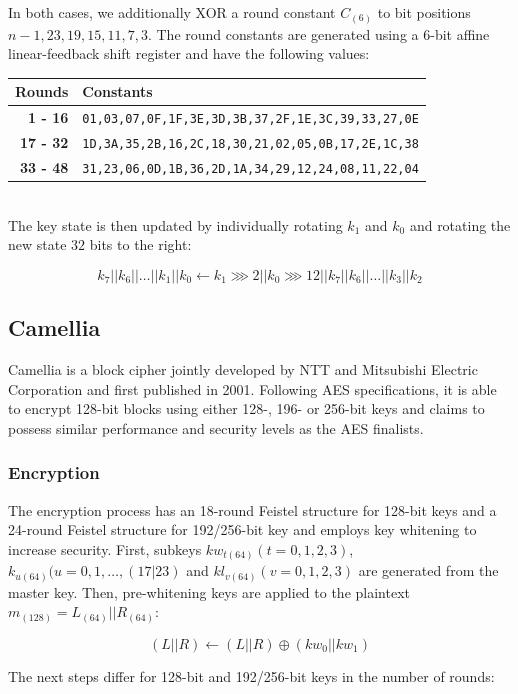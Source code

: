 In both cases, we additionally XOR a round constant $C_{(6)}$ to bit positions
$n-1,23,19,15,11,7,3$. The round constants are generated using a 6-bit affine
linear-feedback shift register and have the following values:\\

\begin{tabular}{r|l}
    \textbf{Rounds} & \textbf{Constants} \\
    \hline
    \textbf{1 - 16} &  \small\texttt{01,03,07,0F,1F,3E,3D,3B,37,2F,1E,3C,39,33,27,0E} \\
    \textbf{17 - 32} & \small\texttt{1D,3A,35,2B,16,2C,18,30,21,02,05,0B,17,2E,1C,38} \\
    \textbf{33 - 48} & \small\texttt{31,23,06,0D,1B,36,2D,1A,34,29,12,24,08,11,22,04}
\end{tabular}\\

The key state is then updated by individually rotating $k_1$ and $k_0$ and
rotating the new state $32$ bits to the right:

\[
    k_7||k_6||\dots||k_1||k_0\leftarrow k_1\ggg 2||k_0\ggg 12||k_7||k_6||\dots||k_3||k_2
\]

\subsection{Camellia}

Camellia\cite{camellia:2001} is a block cipher jointly developed by NTT and
Mitsubishi Electric Corporation and first published in 2001. Following AES
specifications, it is able to encrypt 128-bit blocks using either 128-, 196- or
256-bit keys and claims to possess similar performance and security levels as
the AES finalists.

\subsubsection{Encryption}

The encryption process has an 18-round Feistel structure for 128-bit keys and a
24-round Feistel structure for 192/256-bit key and employs key whitening to
increase security. First, subkeys $kw_{t(64)}(t=0,1,2,3)$,
$k_{u(64)}(u=0,1,\dots,(17|23)$ and $kl_{v(64)}(v=0,1,2,3)$ are generated from
the master key. Then, pre-whitening keys are applied to the plaintext
$m_{(128)}=L_{(64)}||R_{(64)}$:

\[
    (L||R)\leftarrow (L||R)\oplus (kw_0||kw_1)
\]

The next steps differ for 128-bit and 192/256-bit keys in the number of rounds:

